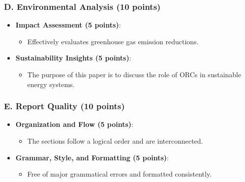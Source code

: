 \documentclass[11pt]{article}
\begin{document}
\subsubsection*{D. Environmental Analysis (10 points)}
\begin{itemize}
    \item \textbf{Impact Assessment (5 points)}:
    \begin{itemize}
        \item Effectively evaluates greenhouse gas emission reductions.
    \end{itemize}
    \item \textbf{Sustainability Insights (5 points)}:
    \begin{itemize}
        \item The purpose of this paper is to discuss the role of ORCs in sustainable energy systems.
    \end{itemize}
\end{itemize}

\subsubsection*{E. Report Quality (10 points)}
\begin{itemize}
    \item \textbf{Organization and Flow (5 points)}:
    \begin{itemize}
        \item The sections follow a logical order and are interconnected.
    \end{itemize}
    \item \textbf{Grammar, Style, and Formatting (5 points)}:
    \begin{itemize}
        \item Free of major grammatical errors and formatted consistently.
    \end{itemize}
\end{itemize}
\end{document}
